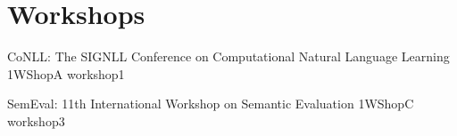 \chapter[Workshops: \daydate]{Workshops}
\thispagestyle{emptyheader}
\vfill




\clearpage
{}

\begin{wsschedule}
  {CoNLL: The SIGNLL Conference on Computational Natural Language Learning}
  {1}{WShopA}
  {workshop1}
  {\WShopLocA}
  
\end{wsschedule}

\begin{wsschedule}
  {SemEval: 11th International Workshop on Semantic Evaluation}
  {1}{WShopC}
  {workshop3}
  {\WShopLocC}
  
\end{wsschedule}
        


%  


%  

%  

